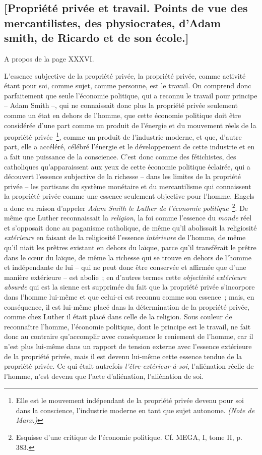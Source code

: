 \documentclass[french,twoside]{book} %
\begin{document}
\subsection[{[Propriété privée et travail. Points de vue des mercantilistes, des physiocrates, d’Adam smith, de Ricardo et de son école.]}]{[Propriété privée et travail. Points de vue des mercantilistes, des physiocrates, d’Adam smith, de Ricardo et de son école.]}
\noindent [I] A propos de la page XXXVI.\par
L’essence subjective de la propriété privée, la propriété privée, comme activité étant pour soi, comme sujet, comme personne, est le travail. On comprend donc parfaitement que seule l’économie politique, qui a reconnu le travail pour principe – Adam Smith –, qui ne connaissait donc plus la propriété privée seulement comme un état en dehors de l’homme, que cette économie politique doit être considérée d’une part comme un produit de l’énergie et du mouvement réels de la propriété privée \footnote{Elle est le mouvement indépendant de la propriété privée devenu pour soi dans la conscience, l’industrie moderne en tant que sujet autonome. \emph{(Note de Marx.)}}, comme un produit de l’industrie moderne, et que, d’autre part, elle a accéléré, célébré l’énergie et le développement de cette industrie et en a fait une puissance de la conscience. C’est donc comme des fétichistes, des catholiques qu’apparaissent aux yeux de cette économie politique éclairée, qui a découvert l’essence subjective de la richesse – dans les limites de la propriété privée – les partisans du système monétaire et du mercantilisme qui connaissent la propriété privée comme une essence seulement objective pour l’homme. Engels a donc eu raison d’appeler \emph{Adam Smith le Luther de l’économie politique} \footnote{Esquisse d’une critique de l’économie politique. Cf. MEGA, I, tome II, p. 383.}. De même que Luther reconnaissait la \emph{religion}, la foi comme l’essence du \emph{monde} réel et s’opposait donc au paganisme catholique, de même qu’il abolissait la religiosité \emph{extérieure} en faisant de la religiosité l’essence \emph{intérieure} de l’homme, de même qu’il niait les prêtres existant en dehors du laïque, parce qu’il transférait le prêtre dans le cœur du laïque, de même la richesse qui se trouve en dehors de l’homme et indépendante de lui – qui ne peut donc être conservée et affirmée que d’une manière extérieure – est abolie ; en d’autres termes cette \emph{objectivité extérieure absurde} qui est la sienne est supprimée du fait que la propriété privée s’incorpore dans l’homme lui-même et que celui-ci est reconnu comme son essence ; mais, en conséquence, il est lui-même placé dans la détermination de la propriété privée, comme chez Luther il était placé dans celle de la religion. Sous couleur de reconnaître l’homme, l’économie politique, dont le principe est le travail, ne fait donc au contraire qu’accomplir avec conséquence le reniement de l’homme, car il n’est plus lui-même dans un rapport de tension externe avec l’essence extérieure de la propriété privée, mais il est devenu lui-même cette essence tendue de la propriété privée. Ce qui était autrefois \emph{l’être-extérieur-à-soi}, l’aliénation réelle de l’homme, n’est devenu que l’acte d’aliénation, l’aliénation de soi. 
\end{document}
